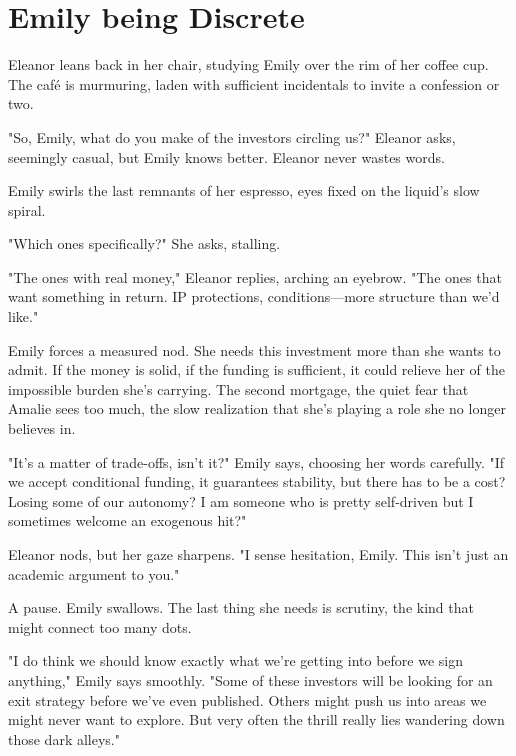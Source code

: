 \section*{Emily being Discrete}

Eleanor leans back in her chair, studying Emily over the rim of her coffee cup. The café is murmuring, laden with sufficient incidentals to invite a confession or two. 

\smallskip

"So, Emily, what do you make of the investors circling us?" Eleanor asks, seemingly casual, but Emily knows better. Eleanor never wastes words. 

\smallskip

Emily swirls the last remnants of her espresso, eyes fixed on the liquid’s slow spiral. 

\smallskip

"Which ones specifically?" She asks, stalling.

\smallskip

"The ones with real money," Eleanor replies, arching an eyebrow. "The ones that want something in return. IP protections, conditions—more structure than we’d like." 

\smallskip

Emily forces a measured nod. She needs this investment more than she wants to admit. If the money is solid, if the funding is sufficient, it could relieve her of the impossible burden she’s carrying. The second mortgage, the quiet fear that Amalie sees too much, the slow realization that she’s playing a role she no longer believes in. 

\smallskip

"It’s a matter of trade-offs, isn’t it?" Emily says, choosing her words carefully. "If we accept conditional funding, it guarantees stability, but there has to be a cost? Losing some of our autonomy? I am someone who is pretty self-driven but I sometimes welcome an exogenous hit?" 

Eleanor nods, but her gaze sharpens. "I sense hesitation, Emily. This isn’t just an academic argument to you."

A pause. Emily swallows. The last thing she needs is scrutiny, the kind that might connect too many dots. 

\smallskip

"I do think we should know exactly what we’re getting into before we sign anything," Emily says smoothly. "Some of these investors will be looking for an exit strategy before we’ve even published. Others might push us into areas we might never want to explore. But very often the thrill really lies wandering down those dark alleys." 

